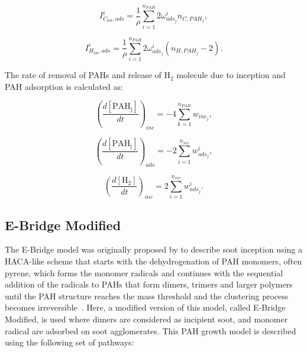 \begin{equation}
	I^i_{C_{tot},ads} =
	\frac{1}{\rho}
	\sum_{i=1}^{n_{PAH}}
	2\omega^i_{ads_j}
	n_{C,PAH_j}
	\label{eqn:ICtotads_dimcoal},
\end{equation}

\begin{equation}
	I^i_{H_{tot},ads} =
	\frac{1}{\rho}
	\sum_{i=1}^{n_{PAH}}
	2\omega^i_{ads_j}
	\left(n_{H,PAH_j}-2\right)
	\label{eqn:IHtotads_dimcoal}.
\end{equation}

The rate of removal of PAHs and release of $\mathrm{H_2}$ molecule due to inception and PAH adsorption is calculated as:

\begin{equation}
	\left(
	\frac{d\left[{\mathrm{PAH_j}}\right]}{dt}
	\right)_{inc}
	= 
	-4\sum_{k=1}^{n_{PAH}}w_{inc_{j}},
	\label{eqn:PAHscrub_dimcoal_inc}
\end{equation}

\begin{equation}
	\left(
	\frac{d\left[{\mathrm{PAH_j}}\right]}{dt}
	\right)_{ads}
	= 
	-2\sum_{i=1}^{n_{sec}}w^i_{ads_j},
	\label{eqn:PAHscrub_dimcoal_ads}
\end{equation}

\begin{equation}
	\left(
	\frac{d\left[{\mathrm{H_2}}\right]}{dt}
	\right)_{inc}
	= 
	2\sum_{i=1}^{n_{sec}}w^i_{ads_j}
	\label{eqn:H2scrub_dimcoal}.
\end{equation}

\subsection{E-Bridge Modified}
The E-Bridge model was originally proposed by \citet{frenklach2020mechanism} to describe soot inception using a HACA-like scheme that starts with the dehydrogenation of PAH monomers, often pyrene, which forms the monomer radicals and continues with the sequential addition of the radicals to PAHs that form dimers, trimers and larger polymers until the PAH structure reaches the mass threshold and the clustering process becomes irreversible~\citep{frenklach2020mechanism}. Here, a modified version of this model, called E-Bridge Modified, is used where dimers are considered as incipient soot, and monomer radical are adsorbed on soot agglomerates. This PAH growth model is described using the following set of pathways:


